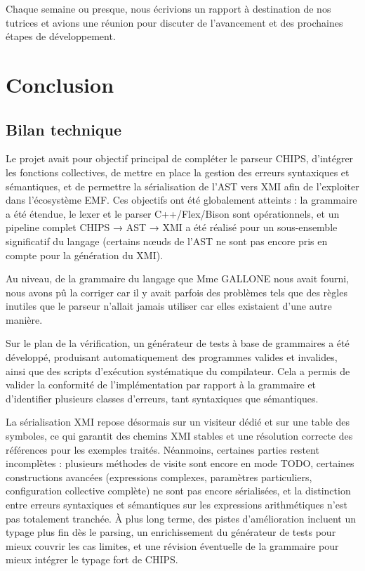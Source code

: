 \documentclass[a4paper, 11pt]{article}
\begin{document}
Chaque semaine ou presque, nous écrivions un rapport à destination de nos tutrices et avions une réunion pour discuter de l'avancement et des prochaines étapes de développement.


\section{Conclusion}
\label{sec:conclusion}

\subsection{Bilan technique}

Le projet avait pour objectif principal de compléter le parseur CHIPS, d’intégrer les fonctions collectives, de mettre en place la gestion des erreurs syntaxiques et sémantiques, et de permettre la sérialisation de l’AST vers XMI afin de l’exploiter dans l’écosystème EMF. Ces objectifs ont été globalement atteints : la grammaire a été étendue, le lexer et le parser C++/Flex/Bison sont opérationnels, et un pipeline complet CHIPS → AST → XMI a été réalisé pour un sous-ensemble significatif du langage (certains nœuds de l'AST ne sont pas encore pris en compte pour la génération du XMI).

Au niveau, de la grammaire du langage que Mme \textsc{GALLONE} nous avait fourni, nous avons pû la corriger car il y avait parfois des problèmes tels que des règles inutiles que le parseur n'allait jamais utiliser car elles existaient d'une autre manière.

Sur le plan de la vérification, un générateur de tests à base de grammaires a été développé, produisant automatiquement des programmes valides et invalides, ainsi que des scripts d’exécution systématique du compilateur. Cela a permis de valider la conformité de l’implémentation par rapport à la grammaire et d’identifier plusieurs classes d’erreurs, tant syntaxiques que sémantiques.

La sérialisation XMI repose désormais sur un visiteur dédié et sur une table des symboles, ce qui garantit des chemins XMI stables et une résolution correcte des références pour les exemples traités. Néanmoins, certaines parties restent incomplètes : plusieurs méthodes de visite sont encore en mode TODO, certaines constructions avancées (expressions complexes, paramètres particuliers, configuration collective complète) ne sont pas encore sérialisées, et la distinction entre erreurs syntaxiques et sémantiques sur les expressions arithmétiques n’est pas totalement tranchée. À plus long terme, des pistes d’amélioration incluent un typage plus fin dès le parsing, un enrichissement du générateur de tests pour mieux couvrir les cas limites, et une révision éventuelle de la grammaire pour mieux intégrer le typage fort de CHIPS.
\end{document}
